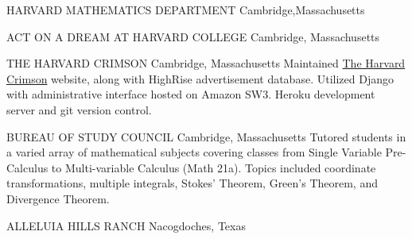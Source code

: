 \documentclass[]{friggeri-cv} %
\begin{document}
{HARVARD MATHEMATICS DEPARTMENT}
{Cambridge,Massachusetts}
{}

{ACT ON A DREAM AT HARVARD COLLEGE}
{Cambridge, Massachusetts}
{}
\begin{detailed}
{THE HARVARD CRIMSON}
{Cambridge, Massachusetts}
{
{Maintained \href{http://thecrimson.com}{The Harvard Crimson} website, along with HighRise advertisement database. Utilized Django with administrative interface hosted on Amazon SW3. Heroku development server and git version control.}}

{BUREAU OF STUDY COUNCIL}
{Cambridge, Massachusetts}
{
{Tutored students in a varied array of mathematical subjects covering classes from Single Variable Pre-Calculus to Multi-variable Calculus (Math 21a). Topics included coordinate transformations, multiple integrals, Stokes' Theorem, Green's Theorem, and Divergence Theorem.}}

{ALLELUIA HILLS RANCH}
{Nacogdoches, Texas}
{}
\end{detailed}
\end{document}
